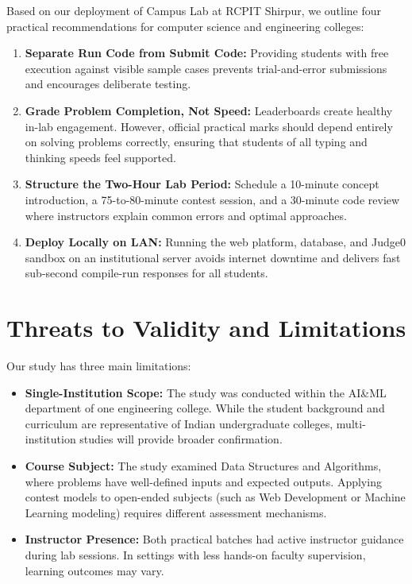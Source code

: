 \documentclass[12pt,a4paper]{article}
\begin{document}
Based on our deployment of Campus Lab at RCPIT Shirpur, we outline four practical recommendations for computer science and engineering colleges:
\begin{enumerate}[leftmargin=1.5em, itemsep=1.5pt]
    \item \textbf{Separate Run Code from Submit Code:} Providing students with free execution against visible sample cases prevents trial-and-error submissions and encourages deliberate testing.
    \item \textbf{Grade Problem Completion, Not Speed:} Leaderboards create healthy in-lab engagement. However, official practical marks should depend entirely on solving problems correctly, ensuring that students of all typing and thinking speeds feel supported.
    \item \textbf{Structure the Two-Hour Lab Period:} Schedule a 10-minute concept introduction, a 75-to-80-minute contest session, and a 30-minute code review where instructors explain common errors and optimal approaches.
    \item \textbf{Deploy Locally on LAN:} Running the web platform, database, and Judge0 sandbox on an institutional server avoids internet downtime and delivers fast sub-second compile-run responses for all students.
\end{enumerate}

\section{Threats to Validity and Limitations}
\label{sec:threats}

Our study has three main limitations:
\begin{itemize}[leftmargin=1.5em, itemsep=1.5pt]
    \item \textbf{Single-Institution Scope:} The study was conducted within the AI\&ML department of one engineering college. While the student background and curriculum are representative of Indian undergraduate colleges, multi-institution studies will provide broader confirmation.
    \item \textbf{Course Subject:} The study examined Data Structures and Algorithms, where problems have well-defined inputs and expected outputs. Applying contest models to open-ended subjects (such as Web Development or Machine Learning modeling) requires different assessment mechanisms.
    \item \textbf{Instructor Presence:} Both practical batches had active instructor guidance during lab sessions. In settings with less hands-on faculty supervision, learning outcomes may vary.
\end{itemize}
\end{document}
